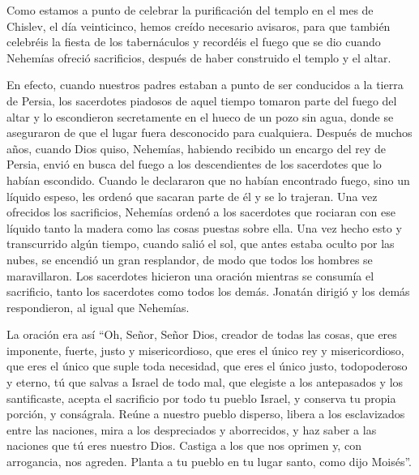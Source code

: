  Como estamos a punto de celebrar la purificación del
templo en el mes de Chislev, el día veinticinco, hemos creído necesario
avisaros, para que también celebréis la fiesta de los tabernáculos y
recordéis el fuego que se dio cuando Nehemías ofreció sacrificios,
después de haber construido el templo y el altar.

 En efecto, cuando nuestros padres estaban a punto de ser
conducidos a la tierra de Persia, los sacerdotes piadosos de aquel
tiempo tomaron parte del fuego del altar y lo escondieron secretamente
en el hueco de un pozo sin agua, donde se aseguraron de que el lugar
fuera desconocido para cualquiera.  Después de muchos
años, cuando Dios quiso, Nehemías, habiendo recibido un encargo del rey
de Persia, envió en busca del fuego a los descendientes de los
sacerdotes que lo habían escondido. Cuando le declararon que no habían
encontrado fuego, sino un líquido espeso,  les ordenó que
sacaran parte de él y se lo trajeran. Una vez ofrecidos los sacrificios,
Nehemías ordenó a los sacerdotes que rociaran con ese líquido tanto la
madera como las cosas puestas sobre ella.  Una vez hecho
esto y transcurrido algún tiempo, cuando salió el sol, que antes estaba
oculto por las nubes, se encendió un gran resplandor, de modo que todos
los hombres se maravillaron.  Los sacerdotes hicieron una
oración mientras se consumía el sacrificio, tanto los sacerdotes como
todos los demás. Jonatán dirigió y los demás respondieron, al igual que
Nehemías.

 La oración era así ``Oh, Señor, Señor Dios, creador de
todas las cosas, que eres imponente, fuerte, justo y misericordioso, que
eres el único rey y misericordioso,  que eres el único
que suple toda necesidad, que eres el único justo, todopoderoso y
eterno, tú que salvas a Israel de todo mal, que elegiste a los
antepasados y los santificaste,  acepta el sacrificio por
todo tu pueblo Israel, y conserva tu propia porción, y conságrala.
 Reúne a nuestro pueblo disperso, libera a los
esclavizados entre las naciones, mira a los despreciados y aborrecidos,
y haz saber a las naciones que tú eres nuestro Dios. 
Castiga a los que nos oprimen y, con arrogancia, nos agreden.
 Planta a tu pueblo en tu lugar santo, como dijo
Moisés''.

